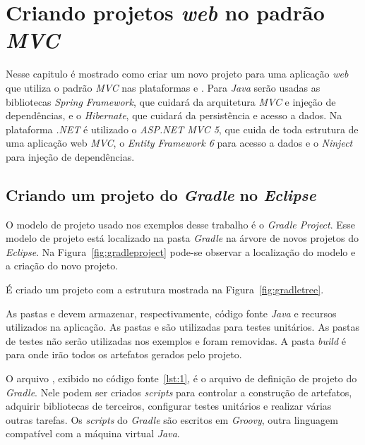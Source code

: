 \chapter{Criando projetos \textit{web} no padrão \textit{MVC}}

Nesse capitulo é mostrado como criar um novo projeto para uma aplicação \textit{web} que utiliza o padrão \textit{MVC} nas plataformas \spring e \anmvc. Para \textit{Java} serão usadas as bibliotecas \textit{Spring Framework}, que cuidará da arquitetura \textit{MVC} e injeção de dependências, e o \textit{Hibernate}, que cuidará da persistência e acesso a dados. Na plataforma \textit{.NET} é utilizado o \textit{ASP.NET MVC 5}, que cuida de toda estrutura de uma aplicação web \textit{MVC}, o \textit{Entity Framework 6} para acesso a dados e o \textit{Ninject} para injeção de dependências.

\section{Criando um projeto do \textit{Gradle} no \textit{Eclipse}}

O modelo de projeto usado nos exemplos desse trabalho é o \textit{Gradle Project}. Esse modelo de projeto está localizado na pasta \textit{Gradle} na árvore de novos projetos do \textit{Eclipse}. Na Figura~\ref{fig:gradleproject} pode-se observar a localização do modelo e a criação do novo projeto.


É criado um projeto com a estrutura mostrada na Figura~\ref{fig:gradletree}.


As pastas  e  devem armazenar, respectivamente, código fonte \textit{Java} e recursos utilizados na aplicação.  As pastas  e  são utilizadas para testes unitários. As pastas de testes não serão utilizadas nos exemplos e foram removidas. A pasta \textit{build} é para onde irão todos os artefatos gerados pelo projeto.

O arquivo , exibido no código fonte~\ref{lst:1}, é o arquivo de definição de projeto do \textit{Gradle}. Nele podem ser criados \textit{scripts} para controlar a construção de artefatos, adquirir bibliotecas de terceiros, configurar testes unitários e realizar várias outras tarefas. Os \textit{scripts} do \textit{Gradle} são escritos em \textit{Groovy}, outra linguagem compatível com a máquina virtual \textit{Java}. 

